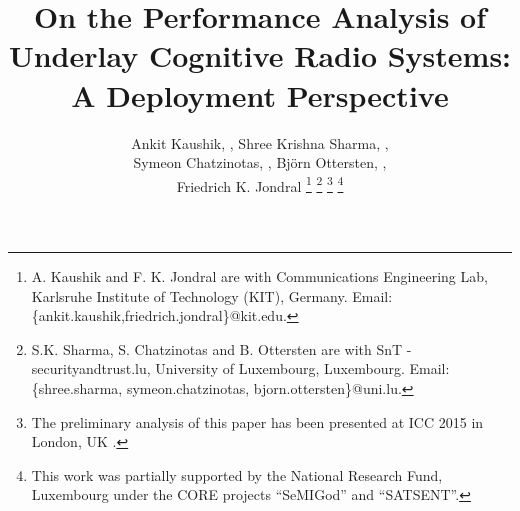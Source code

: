 \documentclass[journal, twocolumn]{IEEEtran}
\begin{document}
%
\title{On the Performance Analysis of Underlay Cognitive Radio Systems: A Deployment Perspective}
\author{Ankit Kaushik, , Shree Krishna Sharma, , \\ Symeon Chatzinotas, ,  Bj\"orn Ottersten, , \\ Friedrich K. Jondral 
\thanks{A. Kaushik and F. K. Jondral are with Communications Engineering Lab, Karlsruhe Institute of Technology (KIT), Germany. Email:{\{ankit.kaushik,friedrich.jondral\}@kit.edu.}}
\thanks{S.K. Sharma, S. Chatzinotas and B. Ottersten are with SnT - securityandtrust.lu, University of Luxembourg, Luxembourg. Email:{\{shree.sharma, symeon.chatzinotas, bjorn.ottersten\}@uni.lu}.}
\thanks{The preliminary analysis of this paper has been presented at ICC 2015 in London, UK \cite{Kaushik15}.}
\thanks{This work was partially supported by the National Research Fund, Luxembourg under the CORE projects ``SeMIGod'' and ``SATSENT''.}
}

\maketitle
\thispagestyle{empty}
\pagestyle{empty}





\end{document}

